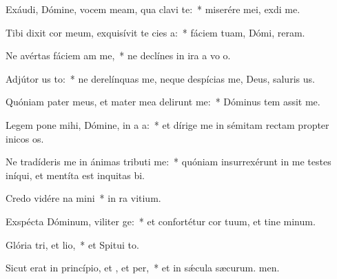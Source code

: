 \item Exáudi, Dómine, vocem meam, qua clavi  te:~* miserére mei,  exdi me.
\item Tibi dixit cor meum, exquisívit te cies a:~* fáciem tuam, Dómi, reram.
\item Ne avértas fáciem am  me,~* ne declínes in ira a vo o.
\item Adjútor us to:~* ne derelínquas me, neque despícias me, Deus, saluris us.
\item Quóniam pater meus, et mater mea delirunt me:~* Dóminus tem assit me.
\item Legem pone mihi, Dómine, in a a:~* et dírige me in sémitam rectam propter inicos os.
\item Ne tradíderis me in ánimas tributi me:~* quóniam insurrexérunt in me testes iníqui, et mentíta est inquitas bi.
\item Credo vidére na mini~* in ra vitium.
\item Exspécta Dóminum, viliter ge:~* et confortétur cor tuum, et tine minum.
\item Glória tri, et lio,~* et Spitui to.
\item Sicut erat in princípio, et , et per,~* et in sǽcula sæcurum. men.
